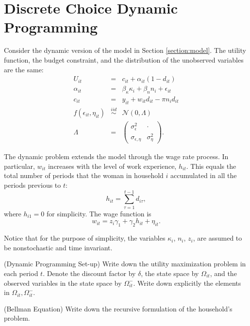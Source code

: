 \section{Discrete Choice Dynamic Programming}
Consider the dynamic version of the model in Section \ref{section:model}. The utility function, the budget constraint, and the distribution of the unobserved variables are the same:
\begin{eqnarray*}
U_{it} &=& c_{it} + \alpha_{it} (1 - d_{it})\\
\alpha_{it} &=& \beta_{\kappa} \kappa_{i} + \beta_{n} n_{i} + \epsilon_{it}\\
c_{it} &=& y_{it} + w_{it} d_{it} - \pi n_{i} d_{it}\\
f \left( \epsilon_{it}, \eta_{it} \right) & \overset{iid}{\sim} & \mathcal{N} \left( 0, \Lambda \right)\\
\Lambda &=& \left( \begin{array}{cc} 
\sigma_{\epsilon}^2 & \cdot \\
\sigma_{\epsilon, \eta} & \sigma_{\eta}^2
\end{array} \right).
\end{eqnarray*}

\indent The dynamic problem extends the model through the wage rate process. In particular, $w_{it}$ increases with the level of work experience, $h_{it}$. This equals the total number of periods that the woman in household $i$ accumulated in all the periods previous to $t$:
\begin{equation*}
h_{it} = \sum\limits_{\tau=1}^{t-1} d_{i\tau},
\end{equation*} 
\noindent where $h_{i1} = 0$ for simplicity. The wage function is
\begin{equation*}
w_{it} = z_{i}\gamma_{1} + \gamma_{2}h_{it} + \eta_{it}.
\end{equation*} 

\noindent Notice that for the purpose of simplicity, the variables $\kappa_i$, $n_i$, $z_i$, are assumed to be nonstochastic and time invariant.

\begin{exercise} (Dynamic Programming Set-up)
Write down the utility maximization problem in each period $t$. Denote the discount factor by  $\delta$, the state space by $\Omega_{it}$, and the observed variables in the state space by $\Omega_{it}^-$. Write down explicitly the elements in $\Omega_{it},\Omega_{it}^-$.
\end{exercise}

\begin{exercise} (Bellman Equation)
Write down the recursive formulation of the household's problem.
\end{exercise}

